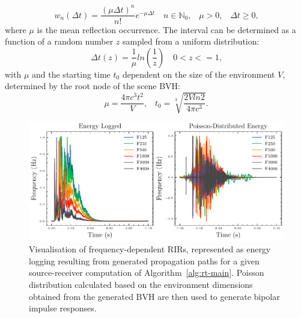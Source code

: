 \begin{equation}
\label{eq:poisson-distributed-diracs}
    w_n(\Delta t) = \frac{(\mu \Delta t)^n}{n!} e^{-\mu \Delta t} \quad n \in \mathbb{N}_0\textrm{,} \quad \mu > 0\textrm{,} \quad \Delta t \ge 0\textrm{,}
\end{equation}
where $\mu$ is the mean reflection occurrence. The interval can be determined as a function of a random number $z$ sampled from a uniform distribution: 
\begin{equation}
    \Delta t(z) = \frac{1}{\mu}ln(\frac{1}{z}) \quad 0 < z <= 1\textrm{,}
\end{equation}
with $\mu$ and the starting time $t_0$ dependent on the size of the environment $V$, determined by the root node of the scene BVH: 
\begin{equation}
    \mu = \frac{4\pi c^3 t^2}{V}\textrm{,} \quad t_0 = \sqrt[3]{\frac{2Vln2}{4\pi c^3}}\textrm{.}
\end{equation}

\begin{figure}[htbp]
    \centering
    \includegraphics[width=1\linewidth]{rir-processing}
    \caption{Visualisation of frequency-dependent RIRs, represented as energy logging resulting from generated propagation paths for a given source-receiver computation of Algorithm~\ref{alg:rt-main}. Poisson distribution calculated based on the environment dimensions obtained from the generated BVH are then used to generate bipolar impulse responses.}
    \label{fig:rir-freqdep-poisson}
\end{figure}


